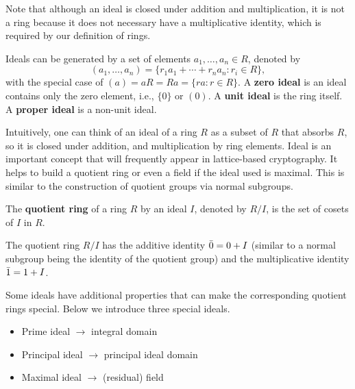 \documentclass[../main.tex]{subfiles}
\begin{document}
Note that although an ideal is closed under addition and multiplication, it is not a ring because it does not necessary have a multiplicative identity, which is required by our definition of rings.%

Ideals can be generated by a set of elements $a_1,\ldots,a_n \in R$, denoted by
\[ (a_1,\ldots,a_n) = \{ r_1 a_1 + \cdots + r_n a_n : r_i \in R \}, \]
with the special case of $(a) = aR = Ra = \{ ra : r\in R\}.$
A \textbf{zero ideal} is an ideal contains only the zero element, i.e., $\{0\}$ or $(0)$. A \textbf{unit ideal} is the ring itself. A \textbf{proper ideal} is a non-unit ideal.

Intuitively, one can think of an ideal of a ring $R$ as a subset of $R$ that absorbs $R$, so it is closed under addition, and multiplication by ring elements. Ideal is an important concept that will frequently appear in lattice-based cryptography. It helps to build a quotient ring or even a field if the ideal used is maximal. This is similar to the construction of quotient groups via normal subgroups. 


\begin{definition}
\label{def:quoRng}
\reversemarginpar
{}
The \textbf{quotient ring} of a ring $R$ by an ideal $I$, denoted by $R/I$, is the set of cosets of $I$ in $R$.
\end{definition}
The quotient ring $R/I$ has the additive identity $\Bar{0}=0+I$ (similar to a normal subgroup being the identity of the quotient group) and the multiplicative identity $\Bar{1}=1+I$.

Some ideals have additional properties that can make the corresponding quotient rings special. 
Below we introduce three special ideals.

\begin{itemize}
    \item Prime ideal $\rightarrow$ integral domain
    \item Principal ideal $\rightarrow$ principal ideal domain
    \item Maximal ideal $\rightarrow$ (residual) field
\end{itemize}
\end{document}
